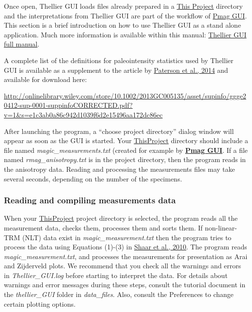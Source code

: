 \documentclass[11pt]{book}
\begin{document}
{Once open, Thellier GUI loads  files already prepared in a  \href{#ThisProject}{This Project} directory and the interpretations from Thellier GUI are part of the workflow of  \href{#pmag_gui.py}{Pmag GUI}.   This section is a brief introduction on how to use Thellier GUI as a stand alone application. Much more information is available within this manual: \href{https://github.com/PmagPy/PmagPy-Cookbook/blob/gh-pages/thellier_GUI_full_manual.pdf}{Thellier GUI full manual}.

\noindent  A complete list of the definitions for paleointensity statistics used by Thellier GUI is available as a supplement to the article by \href{#http://dx.doi.org/10.1002/2013GC005135}{Paterson et al., 2014}  \nocite{paterson14} and available for download here:

  \url{http://onlinelibrary.wiley.com/store/10.1002/2013GC005135/asset/supinfo/ggge20412-sup-0001-suppinfoCORRECTED.pdf?v=1&s=e1c3ab0a86c942d1039f6d2e15496aa172dc86ec}

After launching the program,  a  ``choose project directory'' dialog window will appear as soon as the GUI is started.
%
%
%
Your  \href{#Project_Directory}{ThisProject} directory should include a file named {\it magic\_measurements.txt} (created for example by \href{#pmag_gui.py}{\bf Pmag GUI}.   If a file named {\it rmag\_anisotropy.txt} is in the project directory, then the program reads in the anisotropy data. Reading and processing the measurements files may take several seconds, depending on the number of the specimens.


\subsubsection{Reading and compiling measurements data}
When your \href{#Project_Directory}{ThisProject}  project directory is selected, the program  reads all the measurement data, checks them, processes them and sorts them. If non-linear-TRM (NLT) data exist in {\it magic\_measurement.txt}  then the program tries to process the data using Equations (1)-(3) in \href{http://dx.doi.org/10.7288/V4/MAGIC/12116}{Shaar et al., 2010}. \nocite{shaar10}  The program reads {\it magic\_measurement.txt}, and processes the measurements for presentation as Arai  and Zijderveld plots.
We recommend that you check all the warnings and errors in {\it Thellier\_GUI.log} before starting to interpret the data.  For details about warnings and error messages during these steps, consult the tutorial document in the {\it thellier\_GUI} folder in  {\it data\_files}.  Also, consult the Preferences to change certain plotting options.

}
\end{document}

